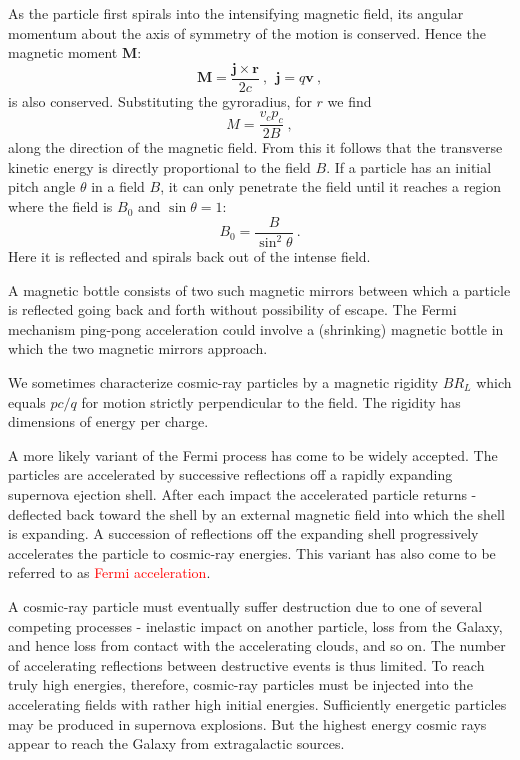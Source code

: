 \documentclass[12pt,a4paper]{article}
\renewcommand{\vec}[1]{\boldsymbol{#1}}
\begin{document}
As the particle first spirals into the intensifying magnetic field, its angular momentum about the axis of symmetry of the motion is conserved. Hence the magnetic moment $\vec{M}$: 
\begin{equation}
\vec{M} = \dfrac{\vec{j} \times \vec{r}}{2c} ~, ~~ \vec{j} = q \vec{v} ~,
\end{equation}
is also conserved. Substituting the gyroradius, for $r$ we find 
\begin{equation}
M = \frac{v_c p_c}{2B} ~,
\end{equation}
along the direction of the magnetic field. From this it follows that the transverse kinetic energy is directly proportional to the field $B$. If a particle has an initial pitch angle $\theta$ in a field $B$, it can only penetrate the field until it reaches a region where the field is $B_0$ and $\sin \theta =1$:
\begin{equation}
B_0 = \dfrac{B}{\sin^2 \theta} ~.
\end{equation}
Here it is reflected and spirals back out of the intense field.

A magnetic bottle consists of two such magnetic mirrors between which a particle is reflected going back and forth without possibility of escape. The Fermi mechanism ping-pong acceleration could involve a (shrinking) magnetic bottle in which the two magnetic mirrors approach.

We sometimes characterize cosmic-ray particles by a magnetic rigidity $BR_L$ which equals $pc/q$ for motion strictly perpendicular to the field. The rigidity has dimensions of energy per charge.

A more likely variant of the Fermi process has come to be widely accepted. The particles are accelerated by successive reflections off a rapidly expanding supernova ejection shell. After each impact the accelerated particle returns - deflected back toward the shell by an external magnetic field into which the shell is expanding. A succession of reflections off the expanding shell progressively accelerates the particle to cosmic-ray energies. This variant has also come to be referred to as \textcolor{red}{Fermi acceleration}.

A cosmic-ray particle must eventually suffer destruction due to one of several competing processes - inelastic impact on another particle, loss from the Galaxy, and hence loss from contact with the accelerating clouds, and so on. The number of accelerating reflections between destructive events is thus limited. To reach truly high energies, therefore, cosmic-ray particles must be injected into the accelerating fields with rather high initial energies. Sufficiently energetic particles may be produced in supernova explosions. But the highest energy cosmic rays appear to reach the Galaxy from extragalactic sources.
\end{document}
